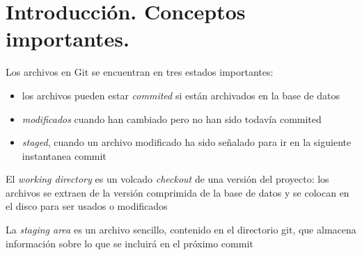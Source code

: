 \documentclass[]{article}
\title{}
\author{}
\begin{document}
\section{Introducción. Conceptos importantes.}

Los archivos en Git se encuentran en  tres estados importantes: 
\begin{itemize}
	\item los archivos pueden estar \textit{commited} si están archivados en la base de datos
	\item \textit{modificados} cuando han cambiado pero no han sido todavía commited
	\item  \textit{staged}, cuando un archivo modificado ha sido señalado para ir en la siguiente instantanea commit
\end{itemize}

  


El \textit{working directory} es un volcado \textit{checkout} de una versión del  proyecto: los archivos se extraen de la versión comprimida de la base de datos y se colocan en el disco para ser usados o modificados

La \textit{staging area} es un archivo sencillo, contenido en el directorio git, que almacena información sobre lo que se incluirá en el próximo commit
\end{document}
